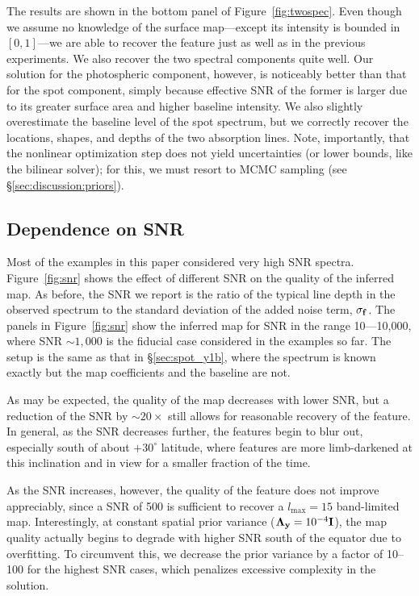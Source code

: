 \documentclass[modern]{aastex631}
\begin{document}
The results are shown in the bottom panel of Figure~\ref{fig:twospec}.
Even though we assume no knowledge of the surface map---except its intensity is bounded in $[0, 1]$---we are able to recover the \spot feature just as well as in the previous experiments.
We also recover the two spectral components quite well.
Our solution for the photospheric component, however, is noticeably better than that for the spot component, simply because effective SNR of the former is larger due to its greater surface area and higher baseline intensity.
We also slightly overestimate the baseline level of the spot spectrum, but we correctly recover the locations, shapes, and depths of the two absorption lines.
Note, importantly, that the nonlinear optimization step does not yield uncertainties (or lower bounds, like the bilinear solver); for this, we must resort to MCMC sampling (see \S\ref{sec:discussion:priors}).

\subsection{Dependence on SNR}
\label{sec:snr}
%
Most of the examples in this paper considered very high SNR spectra.
Figure~\ref{fig:snr} shows the effect of different SNR on the quality of the inferred map. 
As before, the SNR we report is the ratio of the typical line depth in the observed spectrum to the standard deviation of the added noise term, $\sigma_{\mathbf{f}}$.
The panels in Figure~\ref{fig:snr} show the inferred map for SNR in the range 10---10,000, where SNR $\sim 1,000$ is the fiducial case considered in the examples so far. 
The setup is the same as that in \S\ref{sec:spot_y1b}, where the spectrum is known exactly but the map coefficients and the baseline are not.

As may be expected, the quality of the map decreases with lower SNR, but a reduction of the SNR by $\sim 20\times$ still allows for reasonable recovery of the \spot feature. 
In general, as the SNR decreases further, the features begin to blur out, especially south of about $+30^\circ$ latitude, where features are more limb-darkened at this inclination and in view for a smaller fraction of the time.

As the SNR increases, however, the quality of the \spot feature does not improve appreciably, since a SNR of 500 is sufficient to recover a $l_\mathrm{max} = 15$ band-limited map. 
Interestingly, at constant spatial prior variance ($\boldsymbol{\Lambda}_{\mathbf{y}} = 10^{-4}{\mathbf{I}}$), the map quality actually begins to degrade with higher SNR south of the equator due to overfitting.
To circumvent this, we decrease the prior variance by a factor of 10--100 for the highest SNR cases, which penalizes excessive complexity in the solution.
\end{document}
